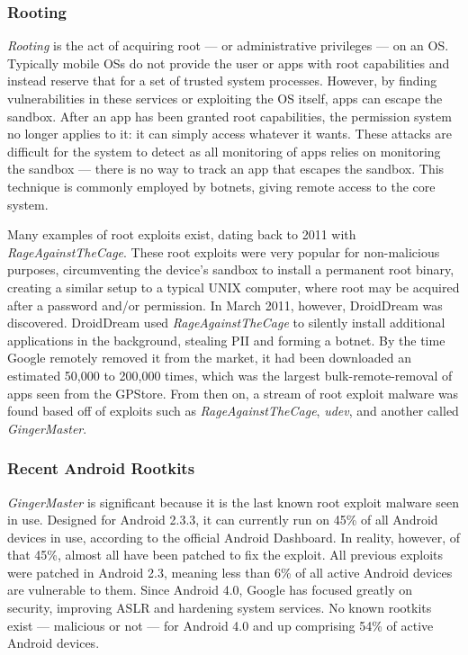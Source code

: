 \documentclass{acm_proc_article-sp}
\begin{document}
\subsubsection{Rooting}
\textit{Rooting} is the act of acquiring root --- or administrative privileges --- on an OS. Typically mobile OSs do not provide the user or apps with root capabilities and instead reserve that for a set of trusted system processes. However, by finding vulnerabilities in these services or exploiting the OS itself, apps can escape the sandbox. After an app has been granted root capabilities, the permission system no longer applies to it: it can simply access whatever it wants. These attacks are difficult for the system to detect as all monitoring of apps relies on monitoring the sandbox --- there is no way to track an app that escapes the sandbox. This technique is commonly employed by botnets, giving remote access to the core system. 

Many examples of root exploits exist, dating back to 2011 with \textit{RageAgainstTheCage}\citep{droiddream}. These root exploits were very popular for non-malicious purposes, circumventing the device's sandbox to install a permanent root binary, creating a similar setup to a typical UNIX computer, where root may be acquired after a password and/or permission. In March 2011, however, DroidDream was discovered. DroidDream used \textit{RageAgainstTheCage} to silently install additional applications in the background, stealing PII and forming a botnet. By the time Google remotely removed it from the market, it had been downloaded an estimated 50,000 to 200,000 times\citep{castillo2010android}, which was the largest bulk-remote-removal of apps seen from the GPStore. From then on, a stream of root exploit malware was found based off of exploits such as \textit{RageAgainstTheCage}, \textit{udev}, and another called \textit{GingerMaster}\citep{gingermaster}.

\subsubsection{Recent Android Rootkits}
\label{sec:recentrootkits}
\textit{GingerMaster}\citep{cskills2011} is significant because it is the last known root exploit malware seen in use. Designed for Android 2.3.3, it can currently run on 45\% of all Android devices in use, according to the official Android Dashboard\citep{androiddashboard}. In reality, however, of that 45\%, almost all have been patched to fix the exploit\citep{cskills2011}. All previous exploits were patched in Android 2.3\citep{cskills2011}, meaning less than 6\% of all active Android devices are vulnerable to them. Since Android 4.0, Google has focused greatly on security, improving ASLR\citep{threatpost2012} and hardening system services\citep{androidjbsecurity}. No known rootkits exist --- malicious or not --- for Android 4.0 and up comprising 54\% of active Android devices.
\end{document}
